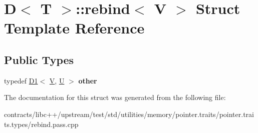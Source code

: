 \hypertarget{struct_d_1_1rebind}{}\section{D$<$ T $>$\+:\+:rebind$<$ V $>$ Struct Template Reference}
\label{struct_d_1_1rebind}
\subsection*{Public Types}
\begin{DoxyCompactItemize}
\item 
\mbox{\label{struct_d_1_1rebind_ad22c61c4abb1f3561ade0e55d584aac5}} 
typedef \mbox{\hyperlink{struct_d1}{D1}}$<$ \mbox{\hyperlink{struct_v}{V}}, \mbox{\hyperlink{union_u}{U}} $>$ {\bfseries other}
\end{DoxyCompactItemize}


The documentation for this struct was generated from the following file\+:\begin{DoxyCompactItemize}
\item 
contracts/libc++/upstream/test/std/utilities/memory/pointer.\+traits/pointer.\+traits.\+types/rebind.\+pass.\+cpp\end{DoxyCompactItemize}
